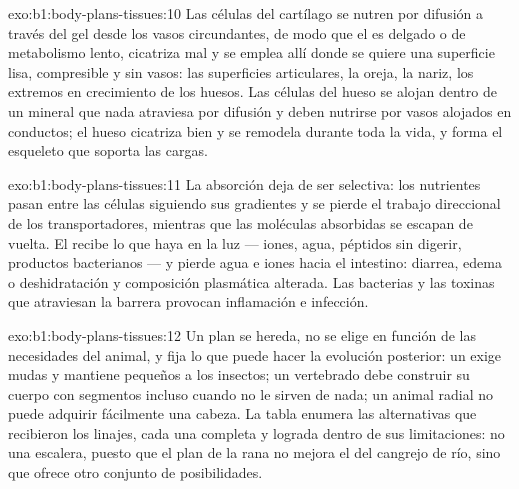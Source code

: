 \begin{solution}{exo:b1:body-plans-tissues:10}
Las células del cartílago se nutren por difusión a través del gel desde los
vasos circundantes, de modo que el  es delgado o de metabolismo lento,
cicatriza mal y se emplea allí donde se quiere una superficie lisa,
compresible y sin vasos: las superficies articulares, la oreja, la nariz,
los extremos en crecimiento de los huesos. Las células del hueso se alojan
dentro de un mineral que nada atraviesa por difusión y deben nutrirse por
vasos alojados en conductos; el hueso cicatriza bien y se remodela durante
toda la vida, y forma el esqueleto que soporta las cargas.
\end{solution}

\begin{solution}{exo:b1:body-plans-tissues:11}
La absorción deja de ser selectiva: los nutrientes pasan entre las células
siguiendo sus gradientes y se pierde el trabajo direccional de los
transportadores, mientras que las moléculas absorbidas se escapan de vuelta.
El  recibe lo que haya en la luz --- iones, agua, péptidos sin
digerir, productos bacterianos --- y pierde agua e iones hacia el intestino:
diarrea, edema o deshidratación y composición plasmática alterada. Las
bacterias y las toxinas que atraviesan la barrera provocan inflamación e
infección.
\end{solution}

\begin{solution}{exo:b1:body-plans-tissues:12}
Un plan se hereda, no se elige en función de las necesidades del animal, y
fija lo que puede hacer la evolución posterior: un  exige mudas y
mantiene pequeños a los insectos; un vertebrado debe construir su cuerpo con
segmentos incluso cuando no le sirven de nada; un animal radial no puede
adquirir fácilmente una cabeza. La tabla enumera las alternativas que
recibieron los linajes, cada una completa y lograda dentro de sus
limitaciones: no una escalera, puesto que el plan de la rana no mejora el
del cangrejo de río, sino que ofrece otro conjunto de posibilidades.
\end{solution}

